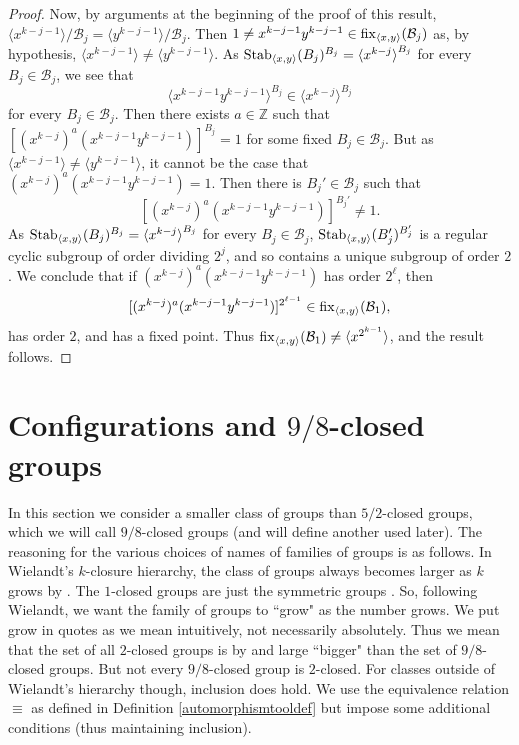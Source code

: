 \documentclass{amsart}
\theoremstyle{definition}
\theoremstyle{remark}
\numberwithin{equation}{section}
\def\Z{{\mathbb Z}}
\def\la{{\langle}}
\def\ra{{\rangle}}
\def\fix{{\rm fix}}
\def\Stab{{\rm Stab}}
\def\cal{\mathcal}
\begin{document}
\begin{proof}
Now, by arguments at the beginning of the proof of this result, $\la x^{k-j-1}\ra/{\cal B}_j = \la y^{k-j-1}\ra/{\cal B}_j$.
Then $1\not = x^{k-j-1}y^{k-j-1}\in\fix_{\la x,y\ra}({\cal B}_j)$ as, by hypothesis, $\la x^{k - j - 1}\ra\not = \la y^{k - j - 1}\ra$.  As $\Stab_{\la x,y\ra}(B_j)^{B_j} = \la x^{k-j}\ra^{B_j}$ for every $B_j\in{\cal B}_j$, we see that $$\la x^{k-j-1}y^{k-j-1}\ra^{B_j}\in \la x^{k - j}\ra^{B_j}$$ for every $B_j\in{\cal B}_j$.  Then there exists $a\in\Z$ such that $[(x^{k-j})^a(x^{k-j-1}y^{k-j-1})]^{B_j} = 1$ for some fixed $B_j\in{\cal B}_j$.  But as $\la x^{k - j -1}\ra\not = \la y^{k - j - 1}\ra$, it cannot be the case that $(x^{k-j})^a(x^{k-j-1}y^{k-j-1}) = 1$.  Then there is $B_j'\in{\cal B}_j$ such that $$[(x^{k-j})^a(x^{k-j-1}y^{k-j-1})]^{B_j'}\not = 1.$$  As $\Stab_{\la x,y\ra}(B_j)^{B_j} = \la x^{k-j}\ra^{B_j}$ for every $B_j\in{\cal B}_j$,  $\Stab_{\la x,y\ra}(B_j')^{B_j'}$ is a regular cyclic subgroup of order dividing $2^j$, and so contains a unique subgroup of order $2$.  We conclude that if $(x^{k-j})^a(x^{k-j-1}y^{k-j-1})$ has order $2^\ell$, then $$[(x^{k-j})^a(x^{k-j-1}y^{k-j-1})]^{2^{\ell - 1}}\in\fix_{\la x,y\ra}({\cal B}_1),$$ has order $2$, and has a fixed point.  Thus $\fix_{\la x,y\ra}({\cal B}_1)\not = \la x^{2^{k-1}}\ra$, and the result follows.
\end{proof}

\section{Configurations and $9/8$-closed groups}

In this section we consider a smaller class of groups than $5/2$-closed groups, which we will call $9/8$-closed groups (and will define another used later).  The reasoning for the various choices of names of families of groups is as follows.  In Wielandt's $k$-closure hierarchy, the class of groups always becomes larger as $k$ grows by \cite[Theorem 5.10]{Wielandt1969}.  The $1$-closed groups are just the symmetric groups \cite[Theorem 5.11]{Wielandt1969}.  So, following Wielandt, we want the family of groups to ``grow" as the number grows.  We put grow in quotes as we mean intuitively, not necessarily absolutely.  Thus we mean that the set of all $2$-closed groups is by and large ``bigger" than the set of $9/8$-closed groups.  But not every $9/8$-closed group is $2$-closed.  For classes outside of Wielandt's hierarchy though, inclusion does hold.  We use the equivalence relation $\equiv$ as defined in Definition \ref{automorphismtooldef} but impose some additional conditions (thus maintaining inclusion).
\end{document}
